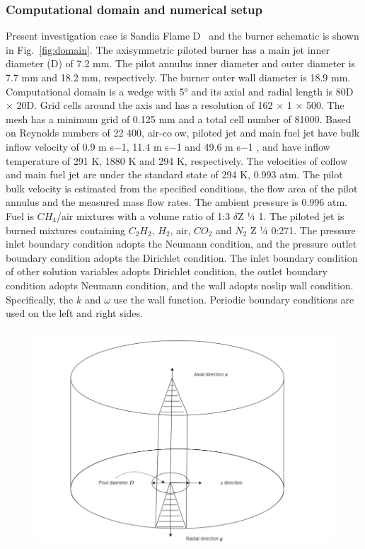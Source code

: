 \subsubsection*{Computational domain and numerical setup}
Present investigation case is Sandia Flame D~\cite{barlow2005piloted} and the burner schematic is shown in Fig.~\ref{fig:domain}. The axisymmetric piloted burner has a main jet inner diameter (D) of 7.2 mm. The pilot annulus inner diameter and outer diameter is 7.7 mm and 18.2 mm, respectively. The burner outer wall diameter is 18.9 mm. Computational domain is a wedge with 5° and its axial and radial length is 80D × 20D. Grid cells around the axis and has a resolution of 162 × 1 × 500. The mesh has a minimum grid of 0.125 mm and a total cell number of 81000. Based on Reynolds numbers of 22 400, air-coow, piloted jet and main fuel jet have bulk inflow velocity of 0.9 m s−1, 11.4 m s−1 and 49.6 m s−1 , and have inflow temperature of 291 K, 1880 K and 294 K, respectively. The velocities of coflow and main fuel jet are under the standard state of 294 K, 0.993 atm. The pilot bulk velocity is estimated from the specified conditions, the flow area of the pilot annulus and the measured mass flow rates. The ambient pressure is 0.996 atm. Fuel is $CH_4$/air mixtures with a volume ratio of 1:3 $\delta$Z ¼ 1. The piloted jet is burned mixtures containing $C_2H_2$, $H_2$, air, $CO_2$ and $N_2$ Z ¼ 0:271. The pressure inlet boundary condition adopts the Neumann condition, and the pressure outlet boundary condition adopts the Dirichlet condition. The inlet boundary condition of other solution variables adopts Dirichlet condition, the outlet boundary condition adopts Neumann condition, and the wall adopts noslip wall condition. Specifically, the $k$ and $\omega$ use the wall function. Periodic boundary conditions are used on the left and right sides.

\begin{figure}[H]
    \centering
    \includegraphics[width=0.95\linewidth]{figs/SandiaD/Screenshot from 2025-03-12 08-14-12.png}
    \label{fig:domain2}
\end{figure}

